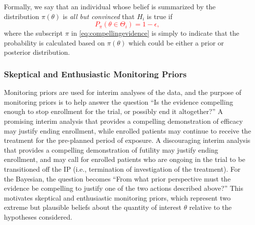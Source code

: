 \documentclass[12pt]{article}
\begin{document}
Formally, we say that an individual whose belief is summarized by the distribution $\pi\left(\theta\right)$ is \textit{all but convinced} that $H_i$ is true if 
\textcolor{red}{
\begin{equation}\label{eq:compellingevidence}
		P_\pi(\theta\in\Theta_i) = 1-\epsilon,
\end{equation} 
}
where the subscript $\pi$ in \eqref{eq:compellingevidence} is simply to indicate that the probability is calculated based on $\pi\left(\theta\right)$ which could be either a prior
or posterior distribution.

\subsubsection{Skeptical and Enthusiastic Monitoring Priors}\label{sec:MP}
Monitoring priors are used for interim analyses of the data, and the purpose of monitoring priors is to help answer the question ``Is the evidence compelling enough to stop enrollment for the trial, or possibly end it altogether?''
%
A promising interim analysis that provides a compelling demonstration of efficacy may justify ending enrollment, while enrolled patients may continue to receive the treatment for the pre-planned period of exposure. 
%
A discouraging interim analysis that provides a compelling demonstration of futility may justify ending enrollment, and may call for enrolled patients who are ongoing in the trial to be transitioned off the IP (i.e., termination of investigation of the treatment). 
%
For the Bayesian, the question becomes ``From what prior perspective must the evidence be compelling to justify one of the two actions described above?'' 
%
This motivates skeptical and enthusiastic monitoring priors, which represent two extreme but plausible beliefs about the quantity of interest $\theta$ relative to the hypotheses considered.
%
\end{document}
